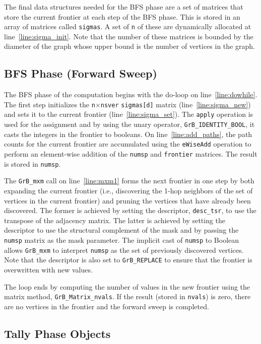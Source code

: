 The final data structures needed for the BFS phase are a set of matrices that
store the current frontier at each step of the BFS phase.  This is stored in
an array of  matrices called {\tt sigmas}.  A set of {\tt n} 
of these are dynamically allocated at line~\ref{line:sigma_init}.  Note that the 
number of these matrices is bounded by the diameter of the graph whose
upper bound is the number of vertices in the graph.


\subsection{BFS Phase (Forward Sweep)}

The BFS phase of the computation begins with the do-loop on line~\ref{line:dowhile}. 
The first step initializes the {\tt n}$\times${\tt nsver} {\tt sigmas[d]} matrix 
(line~\ref{line:sigma_new}) and sets it to the current frontier 
(line~\ref{line:sigma_set}).  The {\tt apply} operation
is used for the assignment and by using the unary operator, {\tt GrB\_IDENTITY\_BOOL},
it casts the integers in the frontier to booleans.
On line~\ref{line:add_paths}, the path counts for the current frontier are
accumulated using the {\tt eWiseAdd} operation to perform an element-wise addition of
the {\tt numsp} and {\tt frontier} matrices.  The result is stored in {\tt numsp}. 

The {\tt GrB\_mxm} call on line~\ref{line:mxm1} forms the next frontier in one step 
by both expanding the current frontier (i.e., discovering the 1-hop neighbors 
of the set of vertices in the current frontier) and pruning the vertices 
that have already been discovered. The former is achieved by setting the
descriptor, {\tt desc\_tsr}, to use the transpose of the adjacency matrix. The 
latter is achieved by setting the descriptor to use the structural complement of the mask 
and by passing the {\tt numsp} matrix as the mask parameter. The 
implicit cast of {\tt numsp} to Boolean allows {\tt GrB\_mxm} to interpret 
{\tt numsp} as the set of previously discovered vertices.  Note that the descriptor is 
also set to {\tt GrB\_REPLACE} to ensure that the frontier is overwritten with new
values.

The loop ends by computing the number of values in the new frontier using the
matrix method, {\tt GrB\_Matrix\_nvals}.  If the result (stored in {\tt nvals}) 
is zero, there are no vertices in the frontier and the forward sweep is completed.

\subsection{Tally Phase Objects}

